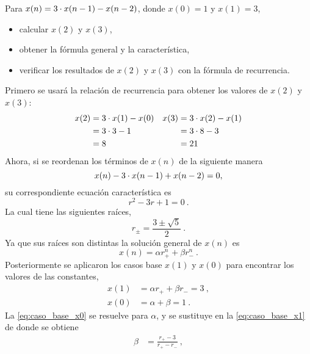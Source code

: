 Para $x(n) = {3} \cdot {x(n-1)} - x(n-2)$, donde $x(0) = 1$ y $x(1) = 3$,
\begin{itemize}
    \item calcular $x(2)$ y $x(3)$,
    \item obtener la fórmula general y la característica,
    \item verificar los resultados de $x(2)$ y $x(3)$ con la fórmula de recurrencia.
\end{itemize}
\begin{solution}
    Primero se usará la relación de recurrencia para obtener los valores de $x(2)$ y $x(3)$:
    \begin{align*}
        x(2) & = \dprod{3}{x(1)} - x(0) & %
        x(3) & = \dprod{3}{x(2)} - x(1) \\
        & = \dprod{3}{3} - 1 & %
        & = \dprod{3}{8} - 3 \\
        & = 8 & %
        & = 21
    \end{align*}
    Ahora, si se reordenan los términos de $x(n)$ de la siguiente manera
    \begin{equation*}
        x(n) - {3} \cdot {x(n-1)} + x(n-2) = 0, 
    \end{equation*}
    su correspondiente ecuación característica es
    \begin{equation*}
        r^2 - 3 r + 1 = 0\ .
    \end{equation*}
    La cual tiene las siguientes raíces,
    \begin{equation*}
        r_{\pm} = \frac{3 \pm \sqrt{5}}{2}\ .
    \end{equation*}
    Ya que sus raíces son distintas la solución general de $x(n)$ es
    \begin{equation}
        x(n) = \alpha r_{+}^n + \beta r_{-}^n\ . \label{eq:solucion_general}
    \end{equation}
    Posteriormente se aplicaron los casos base $x(1)$ y $x(0)$ para encontrar los valores de las constantes,
    \begin{align}
        x(1) & = \alpha r_{+} + \beta r_{-} = 3\ , \label{eq:caso_base_x1} \\
        x(0) & = \alpha + \beta = 1\ . \label{eq:caso_base_x0}
    \end{align}
    La \cref{eq:caso_base_x0} se resuelve para $\alpha$, y se sustituye en la \cref{eq:caso_base_x1} de donde se obtiene
    \begin{align}
        \beta & = \frac{r_{+} - 3}{r_{+} - r_{-}}\ , \nonumber \\

\end{align}
\end{solution}
